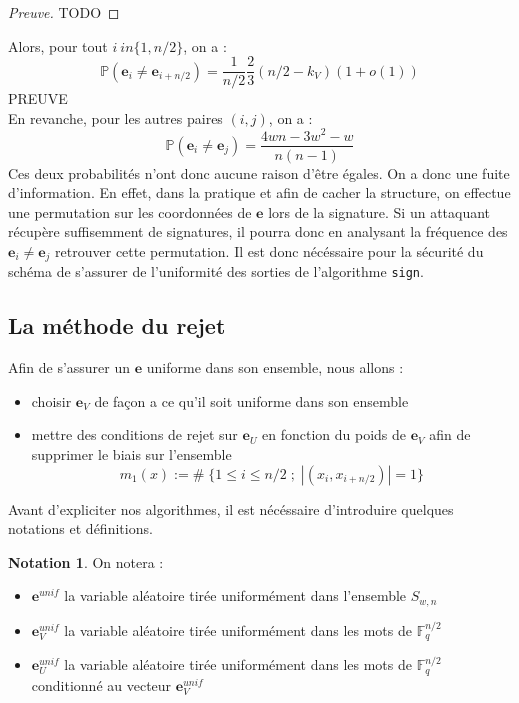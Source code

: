 \documentclass[12pt]{article}
\theoremstyle{definition}
\newtheorem{nota}[thm]{Notation}
\newcommand{\F}{\mathbb{F}}
\newcommand{\e}{\mathbf{e}}
\begin{document}
\begin{proof}[Preuve]
TODO
\end{proof}

Alors, pour tout $i \ in \{1,n/2\}$, on a :
$$ \mathbb{P}(\mathbf{e}_i \neq \mathbf{e}_{i+n/2}) = \frac{1}{n/2}\frac{2}{3}(n/2-k_V)(1+o(1))$$
PREUVE \\
En revanche, pour les autres paires $(i,j)$, on a :
$$ \mathbb{P}(\mathbf{e}_i \neq \mathbf{e}_{j}) = \frac{4wn - 3w^2-w}{n(n-1)}$$
Ces deux probabilités n'ont donc aucune raison d'être égales. On a donc une fuite d'information. En effet, dans la pratique et afin de cacher la structure, on effectue une permutation sur les coordonnées de $\mathbf{e}$ lors de la signature. Si un attaquant récupère suffisemment de signatures, il pourra donc en analysant la fréquence des $\mathbf{e}_i \neq \mathbf{e}_j$ retrouver cette permutation. Il est donc nécéssaire pour la sécurité du schéma de s'assurer de l'uniformité des sorties de l'algorithme \verb|sign|.

\subsection{La méthode du rejet}
Afin de s'assurer un $\mathbf{e}$ uniforme dans son ensemble, nous allons :
\begin{itemize}
\item choisir $\mathbf{e}_V$ de façon a ce qu'il soit uniforme dans son ensemble 
\item mettre des conditions de rejet sur $\mathbf{e}_U$ en fonction du poids de $\mathbf{e}_V$ afin de supprimer le biais sur l'ensemble 
$$ m_1(x) := \# \; \{1  \leq i \leq n/2 \;;\; |(x_i, x_{i+n/2})| = 1\}$$
\end{itemize}
Avant d'expliciter nos algorithmes, il est nécéssaire d'introduire quelques notations et définitions. \\

\begin{nota} On notera :
\begin{itemize}
\item $\mathbf{e}^{unif}$ la variable aléatoire tirée uniformément dans l'ensemble $S_{w,n}$
\item $\mathbf{e}_V^{unif}$ la variable aléatoire tirée uniformément dans les mots de $\F_q^{n/2}$ 
\item $\mathbf{e}_U^{unif}$ la variable aléatoire tirée uniformément dans les mots de $\F_q^{n/2}$ conditionné au vecteur $\e_V^{unif}$
\end{itemize}
\end{nota}
\end{document}
